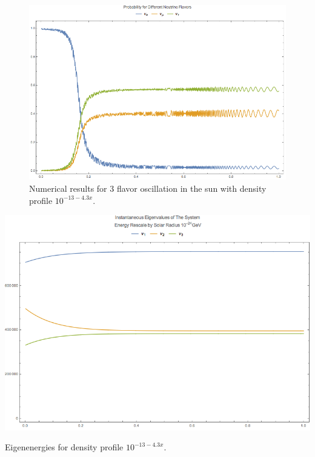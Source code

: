 \documentclass{tufte-handout}
\begin{document}
\begin{figure}
\centering
\includegraphics{assets/numericalMSW3Flavor-2-probability}
\caption{Numerical results for 3 flavor oscillation in the sun with density profile $10^{-13 - 4.3 x}$.}
\label{fig:numericalMSW3Flavor-2-probability}
\end{figure}


\begin{marginfigure}[6\baselineskip]
\centering
\includegraphics{assets/numericalMSW3Flavor-minus14-Inst-Eigen-Energies.png}
\caption{Eigenenergies for density profile $10^{-13 - 4.3 x}$.}
\label{fig:numericalMSW3Flavor-minus14-Inst-Eigen-Energies}
\end{marginfigure}
\end{document}
